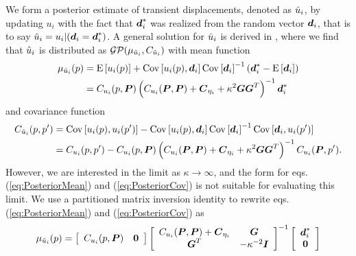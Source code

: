 \documentclass[extra,mreferee]{gji}
\begin{document}
We form a posterior estimate of transient displacements, denoted as
$\hat{u}_i$, by updating $u_i$ with the fact that $\data_i^*$ was
realized from the random vector $\data_i$, that is to say $\post_i =
u_i |(\data_i = \data^*_i)$. A general solution for $\hat{u}_i$ is
derived in \citet[sec. 8.9]{VonMises1964}, where we find that
$\hat{u}_i$ is distributed as $\mathcal{GP}(\mu_{\hat{u}_i},C_{\hat{u}_i})$
with mean function
\begin{align}\label{eq:PosteriorMean}
\mu_{\post_i}(p) &= \E{u_i(p)} + 
                    \Cov{u_i(p),\data_i} 
                    \Cov{\data_i}^{-1}
                    \left(\data^*_i - \E{\data_i}\right)\nonumber \\
                 &= C_{u_i}(p,\points)\left( C_{u_i}(\points,\points) + 
                                             \mitbf{C}_{\eta_i} + 
                                             \kappa^2\G\G^T\right)^{-1}
                    \data^*_i
\end{align}    
and covariance function
\begin{align}\label{eq:PosteriorCov}
C_{\post_i}(p,p') &= \Cov{u_i(p),u_i(p')} - 
                     \Cov{u_i(p),\data_i} 
                     \Cov{\data_i}^{-1}
                     \Cov{\data_i,u_i(p')} \nonumber \\
                  &= C_{u_i}(p,p') - 
                     C_{u_i}(p,\points)\left( C_{u_i}(\points,\points) + 
                                              \mitbf{C}_{\eta_i} + 
                                              \kappa^2\G\G^T \right)^{-1}
                     C_{u_i}(\points,p').
\end{align}
However, we are interested in the limit as $\kappa \to \infty$, and
the form for eqs. (\ref{eq:PosteriorMean}) and (\ref{eq:PosteriorCov})
is not suitable for evaluating this limit. We use a partitioned matrix
inversion identity \citep[sec. 2.7.4]{Press2007} to rewrite eqs.
(\ref{eq:PosteriorMean}) and (\ref{eq:PosteriorCov}) as
\begin{equation}\label{eq:PosteriorMean2}
\mu_{\post_i}(p) = \left[\begin{array}{cc} 
                         C_{u_i}(p,\points) & \zeros \\
                         \end{array}\right]
                   \left[\begin{array}{cc}
                         C_{u_i}(\points,\points) + \mitbf{C}_{\eta_i} & \G \\
                         \G^T  & -\kappa^{-2} \eye \\
                         \end{array}\right]^{-1}
                   \left[\begin{array}{c}
                         \data^*_i \\
                         \zeros \\
                         \end{array}\right]
\end{equation}    
\end{document}
